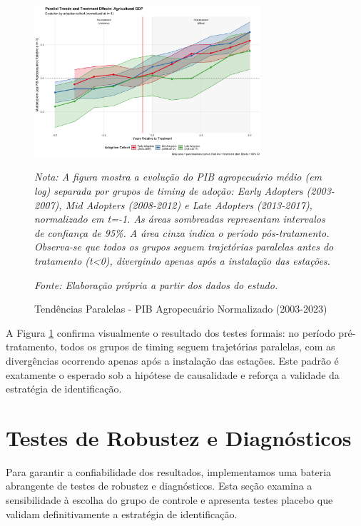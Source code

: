 \documentclass[
	12pt,				%
	oneside,			%
	a4paper,			%
	english,			%
	french,				%
	spanish,			%
	brazil				%
	]{abntex2}
\begin{document}
\begin{figure}[H]
\centering
\caption{Tendências Paralelas - PIB Agropecuário Normalizado (2003-2023)}
\label{fig:parallel_trends}
\includegraphics[width=0.75\textwidth]{../../../data/outputs/parallel_trends_complete_pib_agro_normalized.png}

\textit{Nota: A figura mostra a evolução do PIB agropecuário médio (em log) separada por grupos de timing de adoção: Early Adopters (2003-2007), Mid Adopters (2008-2012) e Late Adopters (2013-2017), normalizado em t=-1. As áreas sombreadas representam intervalos de confiança de 95\%. A área cinza indica o período pós-tratamento. Observa-se que todos os grupos seguem trajetórias paralelas antes do tratamento (t<0), divergindo apenas após a instalação das estações.}

\textit{Fonte: Elaboração própria a partir dos dados do estudo.}
\end{figure}

A Figura \ref{fig:parallel_trends} confirma visualmente o resultado dos testes formais: no período pré-tratamento, todos os grupos de timing seguem trajetórias paralelas, com as divergências ocorrendo apenas após a instalação das estações. Este padrão é exatamente o esperado sob a hipótese de causalidade e reforça a validade da estratégia de identificação.

\FloatBarrier
\section{Testes de Robustez e Diagnósticos}

Para garantir a confiabilidade dos resultados, implementamos uma bateria abrangente de testes de robustez e diagnósticos. Esta seção examina a sensibilidade à escolha do grupo de controle e apresenta testes placebo que validam definitivamente a estratégia de identificação.
\end{document}

